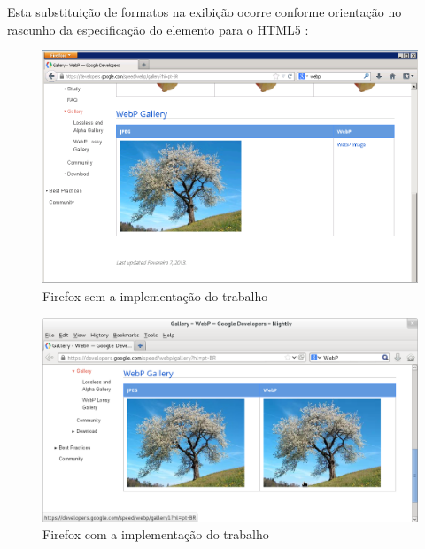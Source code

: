 \documentclass[espaco=simples,appendix=Name]{abnt}
\begin{document}
Esta substituição de formatos na exibição ocorre conforme orientação no rascunho da especificação do elemento  para o HTML5 \cite{CanvasElement}:
\begin{citacao}
\end{citacao}

\begin{figure}[h]
  \centering
    \includegraphics[scale=0.3]{FirefoxSemWebP.png}
  \caption{Firefox sem a implementação do trabalho}
\end{figure}

\begin{figure}[h]
  \centering
    \includegraphics[scale=0.3]{FirefoxComWebP.png}
  \caption{Firefox com a implementação do trabalho}
\end{figure}
\end{document}
